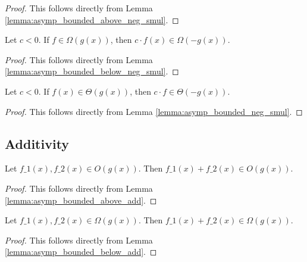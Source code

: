 \begin{proof}
    \leanok
    This follows directly from Lemma \ref{lemma:asymp_bounded_above_neg_smul}.
\end{proof}

\begin{lemma}
    \label{lemma:Omega_neg_smul}
    \leanok
    Let $c < 0$. If $f \in \Omega(g(x))$, then $c \cdot f(x) \in \Omega(-g(x))$.
\end{lemma}

\begin{proof}
    \leanok
    This follows directly from Lemma \ref{lemma:asymp_bounded_below_neg_smul}.
\end{proof}

\begin{lemma}
    \label{lemma:theta_neg_smul}
    \leanok
    Let $c < 0$. If $f(x) \in \Theta(g(x))$, then $c \cdot f \in \Theta(-g(x))$.
\end{lemma}

\begin{proof}
    \leanok
    This follows directly from Lemma \ref{lemma:asymp_bounded_neg_smul}.
\end{proof}


\subsection{Additivity}

\begin{lemma}
    \label{lemma:O_add}
    \leanok
    Let $f\_1(x), f\_2(x) \in O(g(x))$. Then $f\_1(x) + f\_2(x) \in O(g(x))$.
\end{lemma}

\begin{proof}
    \leanok
    This follows directly from Lemma \ref{lemma:asymp_bounded_above_add}.
\end{proof}

\begin{lemma}
    \label{lemma:Omega_add}
    \leanok
    Let $f\_1(x), f\_2(x) \in \Omega(g(x))$. Then $f\_1(x) + f\_2(x) \in \Omega(g(x))$.
\end{lemma}

\begin{proof}
    \leanok
    This follows directly from Lemma \ref{lemma:asymp_bounded_below_add}.
\end{proof}

